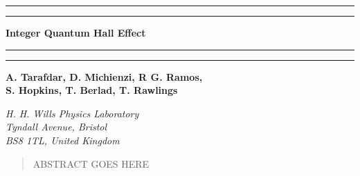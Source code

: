 \begin{titlepage}
    \begin{center}
            
        \vspace*{\baselineskip}

        \rule{\textwidth}{1.6pt}\vspace*{-\baselineskip}\vspace*{2pt} %
	    \rule{\textwidth}{0.4pt} %

        \vspace{1.5\baselineskip}

        \textbf{\Huge{Integer Quantum Hall Effect}}

        \vspace{0.75\baselineskip} %
	
        \rule{\textwidth}{0.4pt}\vspace*{-\baselineskip}\vspace{3.2pt} %
        \rule{\textwidth}{1.6pt} %
        
        \vspace{1.5\baselineskip}

        \textbf{\Large A. Tarafdar, D. Michienzi, R G. Ramos, \\ \vspace{0.1cm}S. Hopkins, T. Berlad, T. Rawlings}

        \vspace{0.5cm}
        \textit{H. H. Wills Physics Laboratory \\ Tyndall Avenue, Bristol \\ BS8 1TL, United Kingdom}

        \vspace{0.5cm}
        \begin{abstract}
            ABSTRACT GOES HERE
        \end{abstract}

    \end{center}
\end{titlepage}